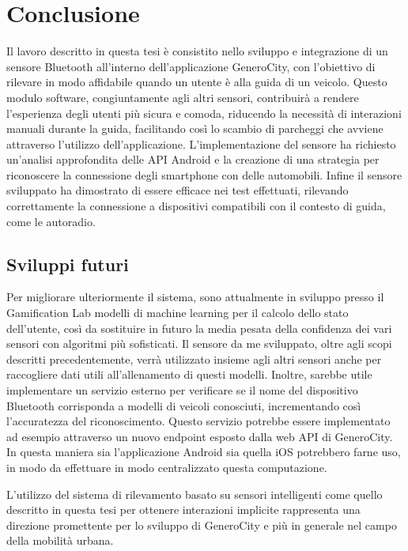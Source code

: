 \chapter{Conclusione}
Il lavoro descritto in questa tesi è consistito nello sviluppo e integrazione di un sensore Bluetooth all'interno dell'applicazione GeneroCity, con l'obiettivo di rilevare in modo affidabile quando un utente è alla guida di un veicolo. Questo modulo software, congiuntamente agli altri sensori, contribuirà a rendere l'esperienza degli utenti più sicura e comoda, riducendo la necessità di interazioni manuali durante la guida, facilitando così lo scambio di parcheggi che avviene attraverso l'utilizzo dell'applicazione. L'implementazione del sensore ha richiesto un'analisi approfondita delle API Android e la creazione di una strategia per riconoscere la connessione degli smartphone con delle automobili. Infine il sensore sviluppato ha dimostrato di essere efficace nei test effettuati, rilevando correttamente la connessione a dispositivi compatibili con il contesto di guida, come le autoradio.


\section{Sviluppi futuri}
Per migliorare ulteriormente il sistema, sono attualmente in sviluppo presso il Gamification Lab modelli di machine learning per il calcolo dello stato dell'utente, così da sostituire in futuro la media pesata della confidenza dei vari sensori con algoritmi più sofisticati. Il sensore da me sviluppato, oltre agli scopi descritti precedentemente, verrà utilizzato insieme agli altri sensori anche per raccogliere dati utili all'allenamento di questi modelli. Inoltre, sarebbe utile implementare un servizio esterno per verificare se il nome del dispositivo Bluetooth corrisponda a modelli di veicoli conosciuti, incrementando così l'accuratezza del riconoscimento. Questo servizio potrebbe essere implementato ad esempio attraverso un nuovo endpoint esposto dalla web API di GeneroCity. In questa maniera sia l'applicazione Android sia quella iOS potrebbero farne uso, in modo da effettuare in modo centralizzato questa computazione.

L'utilizzo del sistema di rilevamento basato su sensori intelligenti come quello descritto in questa tesi per ottenere interazioni implicite rappresenta una direzione promettente per lo sviluppo di GeneroCity e più in generale nel campo della mobilità urbana.

